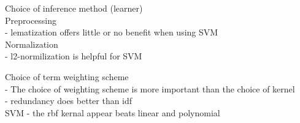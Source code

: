 \documentclass[letterpaper]{article}
\begin{document}
Choice of inference method (learner) \\

Preprocessing \\
- lematization offers little or no benefit when using SVM 
	\cite{leopold2002text}\\

Normalization \\
- l2-normilization is helpful for SVM \cite{leopold2002text}

Choice of term weighting scheme \\ 
- The choice of weighting scheme is more important than the choice
	of kernel \cite{leopold2002text}\\
- redundancy does better than idf\cite{leopold2002text} \\

SVM
- the rbf kernal appear beats linear and polynomial \cite{leopold2002text} \\



\end{document}
